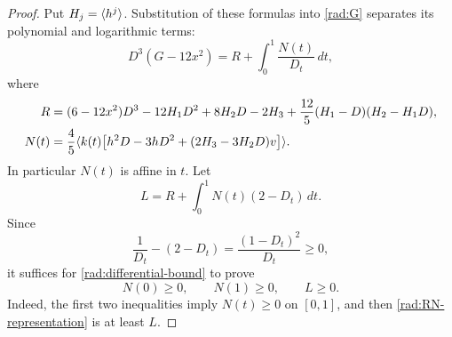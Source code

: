 \begin{proof}
Put $H_j=\langle h^j\rangle$.  Substitution of these formulas into \eqref{rad:G}
separates its polynomial and logarithmic terms:
\begin{equation}\label{rad:RN-representation}
 D^3(G-12x^2)=R+\int_0^1\frac{N(t)}{D_t}\,dt,
\end{equation}
where
\begin{equation}\label{rad:RN-definition}
\begin{aligned}
 R={}&(6-12x^2)D^3-12H_1D^2+8H_2D-2H_3
       +\frac{12}{5}(H_1-D)(H_2-H_1D),\\
 N(t)={}&\frac45\langle k(t)
             \bigl[h^2D-3hD^2+(2H_3-3H_2D)v\bigr]\rangle.
\end{aligned}
\end{equation}
In particular $N(t)$ is affine in $t$.  Let
\begin{equation}\label{rad:L-definition}
 L=R+\int_0^1N(t)(2-D_t)\,dt.
\end{equation}
Since
\[
 \frac1{D_t}-(2-D_t)=\frac{(1-D_t)^2}{D_t}\geq0,
\]
it suffices for \eqref{rad:differential-bound} to prove
\begin{equation}\label{rad:polynomial-goal}
 N(0)\geq0,\qquad N(1)\geq0,\qquad L\geq0.
\end{equation}
Indeed, the first two inequalities imply $N(t)\geq0$ on $[0,1]$, and then
\eqref{rad:RN-representation} is at least $L$.


\end{proof}
